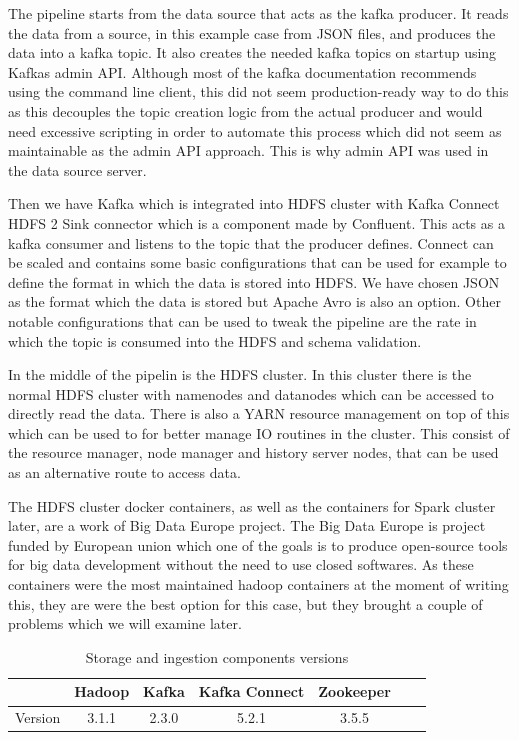 The pipeline starts from the data source that acts as the kafka producer.
It reads the data from a source, in this example case from JSON files, and produces the data into a kafka topic. 
It also creates the needed kafka topics on startup using Kafkas admin API.
Although most of the kafka documentation recommends using the command line client, this did not seem production-ready way to do this as this decouples the topic creation logic from the actual producer and would need excessive scripting in order to automate this process which did not seem as maintainable as the admin API approach.
This is why admin API was used in the data source server. 

Then we have Kafka which is integrated into HDFS cluster with Kafka Connect HDFS 2 Sink connector which is a component made by Confluent.
This acts as a kafka consumer and listens to the topic that the producer defines.
Connect can be scaled and contains some basic configurations that can be used for example to define the format in which the data is stored into HDFS.
We have chosen JSON as the format which the data is stored but Apache Avro is also an option.
Other notable configurations that can be used to tweak the pipeline are the rate in which the topic is consumed into the HDFS and schema validation.

In the middle of the pipelin is the HDFS cluster.
In this cluster there is the normal HDFS cluster with namenodes and datanodes which can be accessed to directly read the data.
There is also a YARN resource management on top of this which can be used to for better manage IO routines in the cluster.
This consist of the resource manager, node manager and history server nodes, that can be used as an alternative route to access data.

The HDFS cluster docker containers, as well as the containers for Spark cluster later, are a work of Big Data Europe project.
The Big Data Europe is project funded by European union which one of the goals is to produce open-source tools for big data development without the need to use closed softwares.\cite{bigdataeurope}
As these containers were the most maintained hadoop containers at the moment of writing this, they are were the best option for this case, but they brought a couple of problems which we will examine later.

\begin{table}[! htbp]\centering
    \caption{Storage and ingestion components versions}
    \begin{threeparttable}
        \begin{tabular}{|c|c|c|c|c|c|c|} 
        \hline
        & Hadoop & Kafka & Kafka Connect & Zookeeper \\ \hline
        Version & 3.1.1 & 2.3.0 & 5.2.1 & 3.5.5\\
        \hline
        \end{tabular}
    \end{threeparttable}
\end{table}

